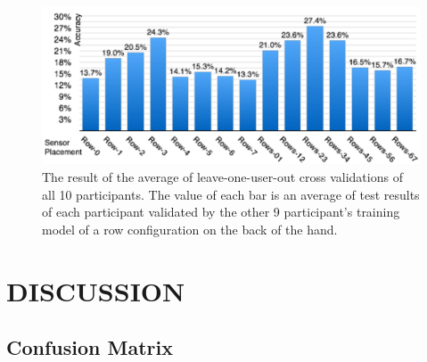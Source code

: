 \documentclass{sigchi}
\begin{document}
\begin{figure}[t]
 \begin{center}
  \includegraphics[width=1\columnwidth]{figures/LOO_V2.pdf}
  \caption{
    The result of the average of leave-one-user-out cross validations of all 10 participants.
    The value of each bar is an average of test results of each participant validated by the other 9 participant's training model of a row configuration on the back of the hand.
  }
  \label{fig:LOO}
  \end{center}
\end{figure}

\section{DISCUSSION}

\subsection{Confusion Matrix}
\end{document}
